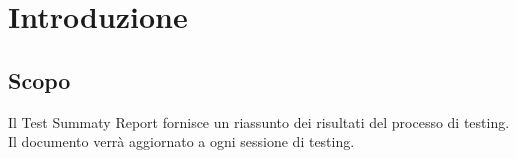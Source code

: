 \chapter{Introduzione}

\section{Scopo}
Il Test Summaty Report fornisce un riassunto dei risultati del processo di testing. Il documento verrà aggiornato a ogni sessione di testing.